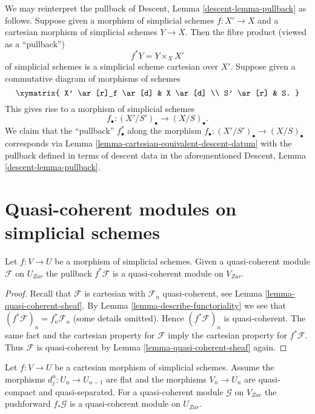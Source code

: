 \noindent
We may reinterpret the pullback of
Descent, Lemma \ref{descent-lemma-pullback} as follows.
Suppose given a morphism of simplicial schemes $f : X' \to X$ and a
cartesian morphism of simplicial schemes $Y \to X$. Then
the fibre product (viewed as a ``pullback'')
$$
f^*Y = Y \times_X X'
$$
of simplicial schemes is a simplicial scheme cartesian over $X'$.
Suppose given a commutative diagram of morphisms of schemes
$$
\xymatrix{
X' \ar[r]_f \ar[d] & X \ar[d] \\
S' \ar[r] & S.
}
$$
This gives rise to a morphism of simplicial schemes
$$
f_\bullet : (X'/S')_\bullet \longrightarrow (X/S)_\bullet.
$$
We claim that the ``pullback'' $f_\bullet^*$ along the morphism
$f_\bullet : (X'/S')_\bullet \to (X/S)_\bullet$ corresponds via
Lemma \ref{lemma-cartesian-equivalent-descent-datum}
with the pullback defined in terms of descent data in
the aforementioned
Descent, Lemma \ref{descent-lemma-pullback}.







\section{Quasi-coherent modules on simplicial schemes}
\label{section-modules-simplicial}

\begin{lemma}
\label{lemma-pullback-cartesian-module}
Let $f : V \to U$ be a morphism of simplicial schemes. Given a
quasi-coherent module $\mathcal{F}$ on $U_{Zar}$ the pullback
$f^*\mathcal{F}$ is a quasi-coherent module on $V_{Zar}$.
\end{lemma}

\begin{proof}
Recall that $\mathcal{F}$ is cartesian with $\mathcal{F}_n$
quasi-coherent, see Lemma \ref{lemma-quasi-coherent-sheaf}.
By Lemma \ref{lemma-describe-functoriality} we see that
$(f^*\mathcal{F})_n = f_n^*\mathcal{F}_n$ (some details omitted).
Hence $(f^*\mathcal{F})_n$ is quasi-coherent.
The same fact and the cartesian property for $\mathcal{F}$
imply the cartesian property for $f^*\mathcal{F}$.
Thus $\mathcal{F}$ is quasi-coherent by
Lemma \ref{lemma-quasi-coherent-sheaf} again.
\end{proof}

\begin{lemma}
\label{lemma-pushforward-cartesian-module}
Let $f : V \to U$ be a cartesian morphism of simplicial schemes.
Assume the morphisms $d^n_j : U_n \to U_{n - 1}$ are
flat and the morphisms $V_n \to U_n$ are quasi-compact and quasi-separated.
For a quasi-coherent module $\mathcal{G}$ on $V_{Zar}$
the pushforward $f_*\mathcal{G}$ is a quasi-coherent module on $U_{Zar}$.
\end{lemma}

